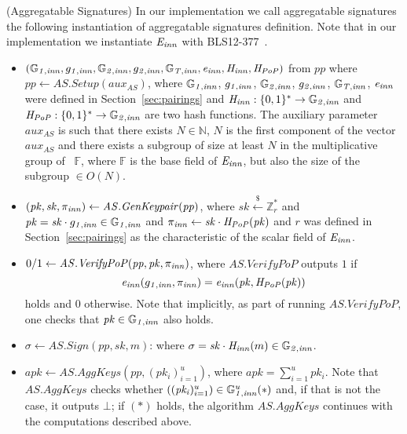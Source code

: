 \begin{construction}(Aggregatable Signatures) 
\label{insta:bls}
In our implementation we call aggregatable signatures the following 
instantiation of aggregatable signatures definition. Note that in our implementation we instantiate $\mathit{E}_{\mathit{inn}}$ with BLS12-377~\cite{zexe}.
\begin{itemize}
\item $(\mathbb{G}_{\mathit{1,inn}}, g_{\mathit{1,inn}}, \mathbb{G}_{\mathit{2,inn}}, g_{\mathit{2,inn}}, \mathbb{G}_{\mathit{T,inn}}, \mathit{e}_{\mathit{inn}}, \mathit{H}_{\mathit{inn}}, \mathit{H}_{\mathit{PoP}})$ from $\mathit{pp}$ where 
$\mathit{pp} \leftarrow  \mathit{AS.Setup}(\mathit{aux_{\mathit{AS}}})$, 
where $\mathbb{G}_{\mathit{1,inn}}$, $g_{\mathit{1,inn}}$, $\mathbb{G}_{\mathit{2,inn}}$, $g_{\mathit{2,inn}}$, $\mathbb{G}_{\mathit{T,inn}}$, $\mathit{e}_{\mathit{inn}}$ were defined in Section~\ref{sec:pairings} and 
$\mathit{H}_{\mathit{inn}}: \{0,1\}^* \rightarrow \mathbb{G}_{\mathit{2,inn}}$ and $\mathit{H}_{\mathit{PoP}}: \{0,1\}^* \rightarrow \mathbb{G}_{\mathit{2,inn}}$ are two hash functions. 
The auxiliary parameter $\mathit{aux_{\mathit{AS}}}$ is such that there exists $N \in \mathbb{N}$, 
$N$ is the first component of the vector $\mathit{aux_{\mathit{AS}}}$ and there exists a subgroup of size at least $N$ in the multiplicative group 
of \ $\mathbb{F}$, where $\mathbb{F}$ is the base field of $\mathit{E}_{\mathit{inn}}$, but also the size of the subgroup $\in O(N)$.

\item $(\mathit{pk},\mathit{sk}, \pi_{\mathit{inn}}) \leftarrow \mathit{AS.GenKeypair}(\mathit{pp})$, where $\mathit{sk} \xleftarrow{\$} \mathbb{Z}_{r}^{*}$  
and $\mathit{pk} = \mathit{sk} \cdot g_{\mathit{1,inn}} \in \mathbb{G}_{\mathit{1,inn}}$ and $\pi_{\mathit{inn}} \leftarrow {\mathit{sk}} \cdot \mathit{H}_{\mathit{PoP}}(\mathit{pk})$ 
and $r$ was defined in Section~\ref{sec:pairings} as the characteristic of the scalar field of $\mathit{E}_{\mathit{inn}}$.

\item $0/1 \leftarrow \mathit{AS.VerifyPoP}(\mathit{pp}, \mathit{pk}, \pi_{\mathit{inn}})$, where $\mathit{AS.VerifyPoP}$ outputs $1$ if 
$$\mathit{e}_{\mathit{inn}}( g_{\mathit{1,inn}}, \pi_{\mathit{inn}}) = \mathit{e}_{\mathit{inn}}(\mathit{pk}, \mathit{H}_{\mathit{PoP}}(\mathit{pk}))$$ holds and $0$ otherwise. Note that implicitly, as part of running 
$\mathit{AS.VerifyPoP}$, one checks that $\mathit{pk} \in \mathbb{G}_{\mathit{1,inn}}$ also holds.

\item $\sigma \leftarrow \mathit{AS.Sign}(\mathit{pp}, \mathit{sk}, m)$: 
where $\sigma = \mathit{sk} \cdot \mathit{H}_{\mathit{inn}}(m) \in \mathbb{G}_{\mathit{2,inn}}$.

\item $\mathit{apk} \leftarrow \mathit{AS.AggKeys}(\mathit{pp}, (\mathit{pk_i})_{i=1}^{u})$, where  $\mathit{apk} = \sum_{i=1}^{u} \mathit{pk_i}$. 
Note that $\mathit{AS.AggKeys}$ checks whether $((\mathit{pk_i})_{i=1}^{u}) \in \mathbb{G}_{\mathit{1,inn}}^{u} (\ast)$ and, if that is not the case, it outputs $\bot$; 
if $(\ast)$ holds, the algorithm $\mathit{AS.AggKeys}$ continues with the computations described above. 



\end{itemize}
\end{construction}
